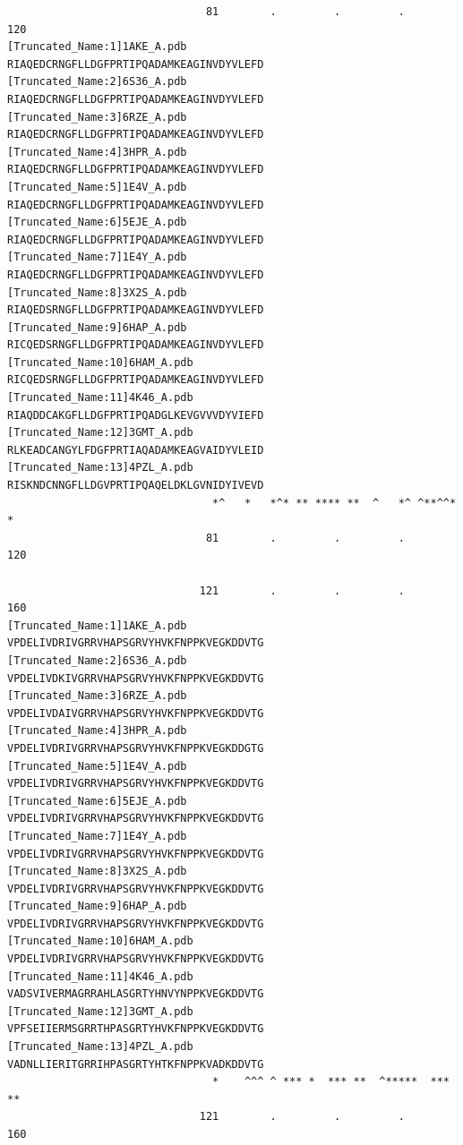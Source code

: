 \documentclass[
  letterpaper,
  DIV=11,
  numbers=noendperiod]{scrartcl}
\begin{document}
\begin{verbatim}
                               81        .         .         .         120 
[Truncated_Name:1]1AKE_A.pdb    RIAQEDCRNGFLLDGFPRTIPQADAMKEAGINVDYVLEFD
[Truncated_Name:2]6S36_A.pdb    RIAQEDCRNGFLLDGFPRTIPQADAMKEAGINVDYVLEFD
[Truncated_Name:3]6RZE_A.pdb    RIAQEDCRNGFLLDGFPRTIPQADAMKEAGINVDYVLEFD
[Truncated_Name:4]3HPR_A.pdb    RIAQEDCRNGFLLDGFPRTIPQADAMKEAGINVDYVLEFD
[Truncated_Name:5]1E4V_A.pdb    RIAQEDCRNGFLLDGFPRTIPQADAMKEAGINVDYVLEFD
[Truncated_Name:6]5EJE_A.pdb    RIAQEDCRNGFLLDGFPRTIPQADAMKEAGINVDYVLEFD
[Truncated_Name:7]1E4Y_A.pdb    RIAQEDCRNGFLLDGFPRTIPQADAMKEAGINVDYVLEFD
[Truncated_Name:8]3X2S_A.pdb    RIAQEDSRNGFLLDGFPRTIPQADAMKEAGINVDYVLEFD
[Truncated_Name:9]6HAP_A.pdb    RICQEDSRNGFLLDGFPRTIPQADAMKEAGINVDYVLEFD
[Truncated_Name:10]6HAM_A.pdb   RICQEDSRNGFLLDGFPRTIPQADAMKEAGINVDYVLEFD
[Truncated_Name:11]4K46_A.pdb   RIAQDDCAKGFLLDGFPRTIPQADGLKEVGVVVDYVIEFD
[Truncated_Name:12]3GMT_A.pdb   RLKEADCANGYLFDGFPRTIAQADAMKEAGVAIDYVLEID
[Truncated_Name:13]4PZL_A.pdb   RISKNDCNNGFLLDGVPRTIPQAQELDKLGVNIDYIVEVD
                                *^   *   *^* ** **** **  ^   *^ ^**^^* * 
                               81        .         .         .         120 

                              121        .         .         .         160 
[Truncated_Name:1]1AKE_A.pdb    VPDELIVDRIVGRRVHAPSGRVYHVKFNPPKVEGKDDVTG
[Truncated_Name:2]6S36_A.pdb    VPDELIVDKIVGRRVHAPSGRVYHVKFNPPKVEGKDDVTG
[Truncated_Name:3]6RZE_A.pdb    VPDELIVDAIVGRRVHAPSGRVYHVKFNPPKVEGKDDVTG
[Truncated_Name:4]3HPR_A.pdb    VPDELIVDRIVGRRVHAPSGRVYHVKFNPPKVEGKDDGTG
[Truncated_Name:5]1E4V_A.pdb    VPDELIVDRIVGRRVHAPSGRVYHVKFNPPKVEGKDDVTG
[Truncated_Name:6]5EJE_A.pdb    VPDELIVDRIVGRRVHAPSGRVYHVKFNPPKVEGKDDVTG
[Truncated_Name:7]1E4Y_A.pdb    VPDELIVDRIVGRRVHAPSGRVYHVKFNPPKVEGKDDVTG
[Truncated_Name:8]3X2S_A.pdb    VPDELIVDRIVGRRVHAPSGRVYHVKFNPPKVEGKDDVTG
[Truncated_Name:9]6HAP_A.pdb    VPDELIVDRIVGRRVHAPSGRVYHVKFNPPKVEGKDDVTG
[Truncated_Name:10]6HAM_A.pdb   VPDELIVDRIVGRRVHAPSGRVYHVKFNPPKVEGKDDVTG
[Truncated_Name:11]4K46_A.pdb   VADSVIVERMAGRRAHLASGRTYHNVYNPPKVEGKDDVTG
[Truncated_Name:12]3GMT_A.pdb   VPFSEIIERMSGRRTHPASGRTYHVKFNPPKVEGKDDVTG
[Truncated_Name:13]4PZL_A.pdb   VADNLLIERITGRRIHPASGRTYHTKFNPPKVADKDDVTG
                                *    ^^^ ^ *** *  *** **  ^*****  *** ** 
                              121        .         .         .         160 


\end{verbatim}
\end{document}
